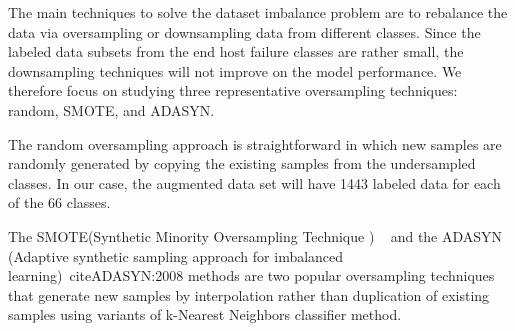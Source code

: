 The main techniques to solve the dataset imbalance problem are to rebalance the data via oversampling or downsampling data from different classes. Since the labeled data subsets from the end host failure classes are rather small, the downsampling techniques will not improve on the model performance. We therefore focus on studying three representative oversampling techniques: random, SMOTE, and ADASYN.

The random oversampling approach is straightforward in which new samples are randomly generated by copying the existing samples from the undersampled classes. In our case, the augmented data set will have 1443 labeled data for each of the 66 classes. 

The SMOTE(Synthetic Minority Oversampling Technique ) ~\cite{smote:2002} and the ADASYN (Adaptive synthetic sampling approach for imbalanced learning)~cite{ADASYN:2008} methods are two popular oversampling techniques that 
generate new samples by interpolation rather than duplication of existing samples using variants of k-Nearest Neighbors classifier method.


